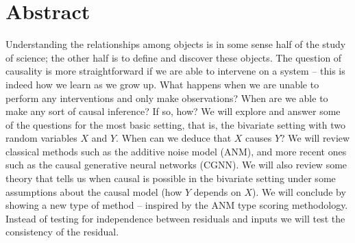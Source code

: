 

\cleardoublepage
\chapter*{Abstract}

Understanding the relationships among objects is in some sense half of the study of science; the other 
half is to define and discover these objects. The question of causality is more straightforward if we 
are able to intervene on a system -- this is indeed how we learn as we grow up. What happens when we 
are unable to perform any interventions and only make observations? When are we able to make any sort 
of causal inference? If so, how? We will explore and answer some of the questions for the most basic 
setting, that is, the bivariate setting with two random variables $X$ and $Y$. When can we deduce that 
$X$ causes $Y$? We will review classical methods such as the additive noise model (ANM), and more recent 
ones such as the causal generative neural networks (CGNN). We will also review some theory that tells us 
when causal is possible in the bivariate setting under some assumptions about the causal model (how $Y$
depends on $X$). We will conclude by showing a new type of method -- inspired by the ANM type scoring 
methodology. Instead of testing for independence between residuals and inputs we will test the consistency 
of the residual. 








